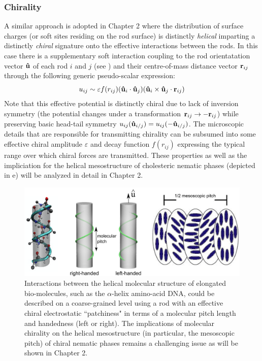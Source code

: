 \documentclass[amssymb]{revtex4}
\begin{document}
\subsubsection{{\bf Chirality}}
 A similar approach is adopted in Chapter 2 where the distribution of surface charges (or soft sites residing on the rod surface) is distinctly {\em helical} imparting a distinctly {\em chiral} signature onto the effective interactions between the rods.  In this case there is a supplementary soft interaction coupling to the rod orientatation vector ${\bf \hat{u}}$ of each rod $i$ and $j$ (see ) and their centre-of-mass distance vector ${\bf r}_{ij}$ through the following generic pseudo-scalar expression:
\begin{equation}
u_{ij} \sim \varepsilon f(r_{ij}) ({\bf \hat{u}}_{i} \cdot {\bf \hat{u}}_{j}) ( {\bf \hat{u}}_{i} \times {\bf \hat{u}}_{j} \cdot {\bf r}_{ij} ) 
\end{equation}
Note that this effective potential is distinctly chiral due to lack of inversion symmetry (the potential changes under a transformation ${\bf r}_{ij} \rightarrow -{\bf r}_{ij} $) while preserving basic head-tail symmetry $u_{ij}({\bf \hat{u}}_{i/j}) = u_{ij}(-{\bf \hat{u}}_{i/j}) $. The microscopic details that are responsible for transmitting chirality can be subsumed into some effective chiral amplitude $\varepsilon$ and decay function  $f(r_{ij})$  expressing the typical range over which chiral forces are transmitted. These properties as well as the impliciation for the helical mesostructure of cholesteric nematic phases (depicted in  e) will be analyzed in detail in Chapter 2.


\begin{figure}
\begin{center}
\includegraphics[width= 0.8 \columnwidth]{pitch}
\caption{ \label{introfig8} Interactions between the helical molecular structure of elongated bio-molecules, such as the $\alpha$-helix amino-acid DNA,  could be described on a coarse-grained level using a rod with an effective chiral electrostatic ``patchiness"  in terms of a molecular pitch length and handedness (left or right). The implications of molecular chirality on the helical mesostructure (in particular, the mesoscopic pitch) of chiral nematic phases remains a challenging issue as will be shown in Chapter 2.   }
\end{center}
\end{figure}
\end{document}
